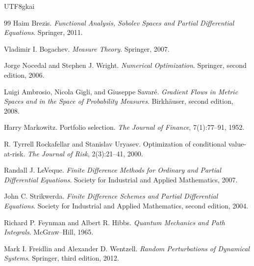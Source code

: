 \documentclass[12pt]{article}
\begin{document}
\begin{CJK*}{UTF8}{gkai}
\begin{thebibliography}{99}
Haim Brezis.
\newblock \emph{Functional Analysis, Sobolev Spaces and Partial Differential Equations}.
\newblock Springer, 2011.

Vladimir I. Bogachev.
\newblock \emph{Measure Theory}.
\newblock Springer, 2007.

Jorge Nocedal and Stephen J. Wright.
\newblock \emph{Numerical Optimization}.
\newblock Springer, second edition, 2006.

Luigi Ambrosio, Nicola Gigli, and Giuseppe Savar\'e.
\newblock \emph{Gradient Flows in Metric Spaces and in the Space of Probability Measures}.
\newblock Birkh\"auser, second edition, 2008.

Harry Markowitz.
\newblock Portfolio selection.
\newblock \emph{The Journal of Finance}, 7(1):77--91, 1952.

R. Tyrrell Rockafellar and Stanislav Uryasev.
\newblock Optimization of conditional value-at-risk.
\newblock \emph{The Journal of Risk}, 2(3):21--41, 2000.

Randall J. LeVeque.
\newblock \emph{Finite Difference Methods for Ordinary and Partial Differential Equations}.
\newblock Society for Industrial and Applied Mathematics, 2007.

John C. Strikwerda.
\newblock \emph{Finite Difference Schemes and Partial Differential Equations}.
\newblock Society for Industrial and Applied Mathematics, second edition, 2004.

Richard P. Feynman and Albert R. Hibbs.
\newblock \emph{Quantum Mechanics and Path Integrals}.
\newblock McGraw--Hill, 1965.

Mark I. Freidlin and Alexander D. Wentzell.
\newblock \emph{Random Perturbations of Dynamical Systems}.
\newblock Springer, third edition, 2012.

\end{thebibliography}

\end{CJK*}
\end{document}
